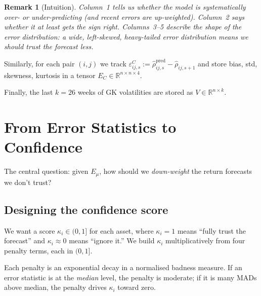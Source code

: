 \documentclass[11pt]{article}
\newtheorem{remark}[theorem]{Remark}
\newcommand{\R}{\mathbb{R}}
\begin{document}
\begin{remark}[Intuition]
Column~1 tells us whether the model is \emph{systematically} over- or under-predicting
(and recent errors are up-weighted).
Column~2 says whether it at least gets the \emph{sign} right.
Columns~3--5 describe the \emph{shape} of the error distribution: a wide, left-skewed,
heavy-tailed error distribution means we should trust the forecast less.
\end{remark}

Similarly, for each pair $(i,j)$ we track $\varepsilon_{ij,s}^C:=\hat\rho_{ij,s}^{\mathrm{pred}}-\hat\rho_{ij,s+1}$
and store bias, std, skewness, kurtosis in a tensor $E_C\in\R^{n\times n\times 4}$.

Finally, the last $k=26$ weeks of GK volatilities are stored as $V\in\R^{n\times k}$.

\section{From Error Statistics to Confidence}\label{sec:confidence}

The central question: given $E_\mu$, how should we \emph{down-weight}
the return forecasts we don't trust?

\subsection{Designing the confidence score}

We want a score $\kappa_i\in(0,1]$ for each asset, where $\kappa_i=1$ means
``fully trust the forecast'' and $\kappa_i\approx 0$ means ``ignore it.''
We build $\kappa_i$ multiplicatively from four penalty terms, each in $(0,1]$.

\begin{tcolorbox}[colback=blue!3, colframe=blue!40!black, title=Design principle]
Each penalty is an exponential decay in a normalised badness measure.
If an error statistic is at the \emph{median} level, the penalty is moderate;
if it is many MADs above median, the penalty drives $\kappa_i$ toward zero.
\end{tcolorbox}
\end{document}
